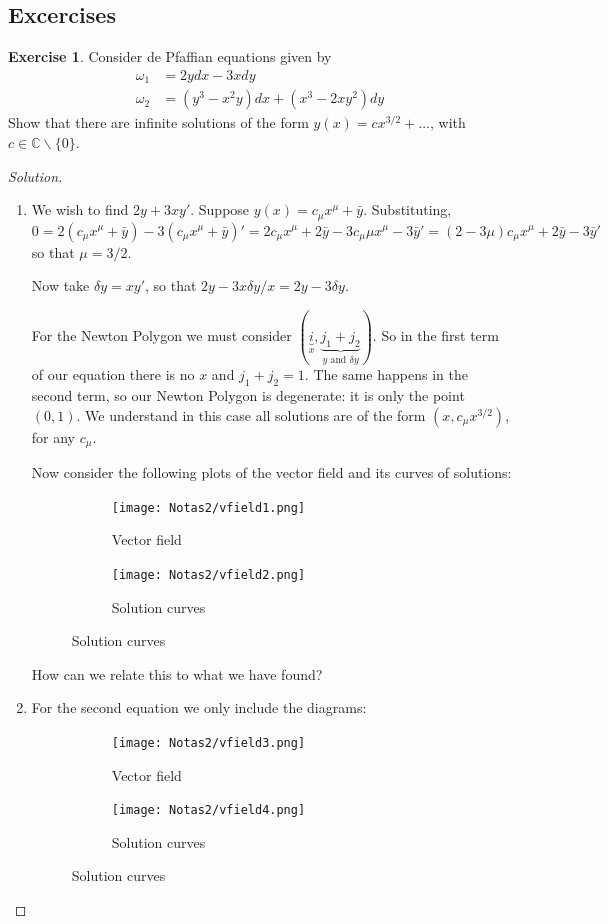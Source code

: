 \documentclass{article}
\theoremstyle{definition}
\newtheorem*{exer*}{Exercise}
\newcommand{\C}{\mathbb{C}}
\begin{document}
\subsection{Excercises}
\begin{exer*}
    Consider de Pfaffian equations given by
    \begin{align}
        \omega_1&=2ydx-3xdy\\
        \omega_2&=(y^3-x^2y)dx+(x^3-2xy^2)dy
    \end{align}
    Show that there are infinite solutions of the form $y(x)=cx^{3/2}+...$, with $c\in\C\backslash\{0\}$.
\end{exer*}
\begin{proof}[Solution]
\begin{enumerate}
\item
   We wish to find $2y+3xy'$.  Suppose $y(x)=c_\mu x^\mu+\bar y$. 
    Substituting, $$0=2(c_\mu x^\mu+\bar y)-3(c_\mu x^\mu+\bar y)'=2c_\mu x^\mu+2\bar y-3c_\mu\mu x^\mu-3\bar y'=(2-3\mu)c_\mu x^\mu+2\bar y-3 \bar y'$$
    so that $\mu=3/2$.\par
    Now take $\delta y=xy'$, so that $2y-3x\delta y/x=2y-3\delta y$.\par
    For the Newton Polygon we must consider $(\underbrace{i}_x,\underbrace{j_1+j_2}_{y\text{ and }\delta y})$.
    So in the first term of our equation there is no $x$ and $j_1+j_2=1$. The same happens in the second term, so our Newton Polygon is degenerate: it is only the point $(0,1)$. We understand in this case all solutions are of the form $(x,c_\mu x^{3/2})$, for any $c_\mu$.\par
    Now consider the following plots of the vector field and its curves of solutions:
    \begin{figure}[H]
    \begin{subfigure}{0.5\textwidth}
        \centering
\texttt{[image: Notas2/vfield1.png]}
        \caption{Vector field}
    \end{subfigure}
    \begin{subfigure}{0.5\textwidth}
        \centering
\texttt{[image: Notas2/vfield2.png]}
        \caption{Solution curves}
    \end{subfigure}
    \end{figure}
How can we relate this to what we have found?
\item For the second equation we only include the diagrams:
  \begin{figure}[H]
    \begin{subfigure}{0.5\textwidth}
        \centering
\texttt{[image: Notas2/vfield3.png]}
        \caption{Vector field}
    \end{subfigure}
    \begin{subfigure}{0.5\textwidth}
        \centering
\texttt{[image: Notas2/vfield4.png]}
        \caption{Solution curves}
    \end{subfigure}
    \end{figure}
\end{enumerate}
    \end{proof}
\end{document}
